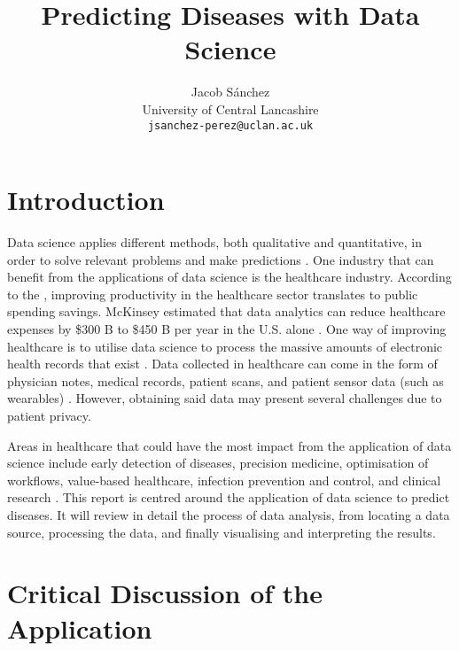 \documentclass[a4paper,12pt]{article}
\title{Predicting Diseases with Data Science}
\author{Jacob Sánchez\\ University of Central Lancashire\\\texttt{jsanchez-perez@uclan.ac.uk}}
\date{}
\begin{document}
\maketitle


\section{Introduction}



Data science applies different methods, both qualitative and quantitative, in order to solve relevant problems and make predictions \parencite[78]{Waller2013}.
One industry that can benefit from the applications of data science is the healthcare industry.
According to the \textcite{oecd2010health}, improving productivity in the healthcare sector translates to public spending savings.
McKinsey estimated that data analytics can reduce healthcare expenses by \$300 B to \$450 B per year in the U.S. alone \parencite{Groves2013}.
One way of improving healthcare is to utilise data science to process the massive amounts of electronic health records that exist \parencite{Dalianis2015}.
Data collected in healthcare can come in the form of physician notes, medical records, patient scans, and patient sensor data (such as wearables) \parencite{Adam2017}.
However, obtaining said data may present several challenges due to patient privacy. 

Areas in healthcare that could have the most impact from the application of data science include early detection of diseases, precision medicine, optimisation of workflows, value-based healthcare, infection prevention and control, and clinical research \parencite[9]{Consoli2019}.
This report is centred around the application of data science to predict diseases.
It will review in detail the process of data analysis, from locating a data source, processing the data, and finally visualising and interpreting the results.

\section{Critical Discussion of the Application}

\end{document}
